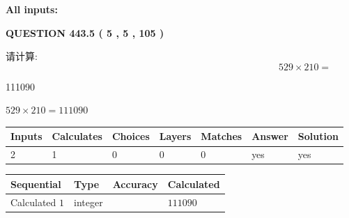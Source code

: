 \documentclass{ctexart}
\begin{document}
   
   
   
\noindent\vspace{0.1in}\hspace{-0.08in} {\textbf{\Large{All inputs: }}}
   
   
  
\vspace{0.2in}
  
{\textbf{\Large{QUESTION
443.5 
 ( 5 , 5 , 105 )
}}}
  
  
 
请计算:
\begin{equation}
529  \times    %
210 = \nonumber
\end{equation}
 
 
 
\noindent{}
 
 

111090
 
 
\noindent{}
 
 

 
 
 
\noindent{}
 
 

$ %
529 \times  %
210=   %
111090$
 
 
\noindent{}
 
 

 
   
   
   
   
\noindent\begin{tabular}{|l|l|l|l|l|l|l|}
 \hline
Inputs & Calculates & Choices & Layers & Matches & Answer & Solution \\ \hline
 2  & 
 1  & 
 0
  & 
 0  & 
 0  & 
  yes & 
  yes 
  \\ \hline
 \end{tabular}
   
   
   
   
\noindent{}
   
   
  
  
\noindent\begin{tabular}{|l|l|l|l|}
\hline
 Sequential & Type & Accuracy & Calculated \\ 
\hline
 
 
  Calculated $  1 $ & integer &  & 
  $ 111090 $ 
 \\  \hline  
 \end{tabular}
   
\end{document}
